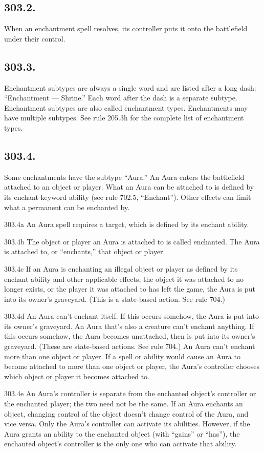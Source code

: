 \subsection*{303.2.}
When an enchantment spell resolves, its controller puts it onto the battlefield under their control.

\subsection*{303.3.}
Enchantment subtypes are always a single word and are listed after a long dash: “Enchantment — Shrine.” Each word after the dash is a separate subtype. Enchantment subtypes are also called enchantment types. Enchantments may have multiple subtypes. See rule 205.3h for the complete list of enchantment types.

\subsection*{303.4.}
Some enchantments have the subtype “Aura.” An Aura enters the battlefield attached to an object or player. What an Aura can be attached to is defined by its enchant keyword ability (see rule 702.5, “Enchant”). Other effects can limit what a permanent can be enchanted by.

303.4a An Aura spell requires a target, which is defined by its enchant ability.

303.4b The object or player an Aura is attached to is called enchanted. The Aura is attached to, or “enchants,” that object or player.

303.4c If an Aura is enchanting an illegal object or player as defined by its enchant ability and other applicable effects, the object it was attached to no longer exists, or the player it was attached to has left the game, the Aura is put into its owner’s graveyard. (This is a state-based action. See rule 704.)

303.4d An Aura can’t enchant itself. If this occurs somehow, the Aura is put into its owner’s graveyard. An Aura that’s also a creature can’t enchant anything. If this occurs somehow, the Aura becomes unattached, then is put into its owner’s graveyard. (These are state-based actions. See rule 704.) An Aura can’t enchant more than one object or player. If a spell or ability would cause an Aura to become attached to more than one object or player, the Aura’s controller chooses which object or player it becomes attached to.

303.4e An Aura’s controller is separate from the enchanted object’s controller or the enchanted player; the two need not be the same. If an Aura enchants an object, changing control of the object doesn’t change control of the Aura, and vice versa. Only the Aura’s controller can activate its abilities. However, if the Aura grants an ability to the enchanted object (with “gains” or “has”), the enchanted object’s controller is the only one who can activate that ability.

